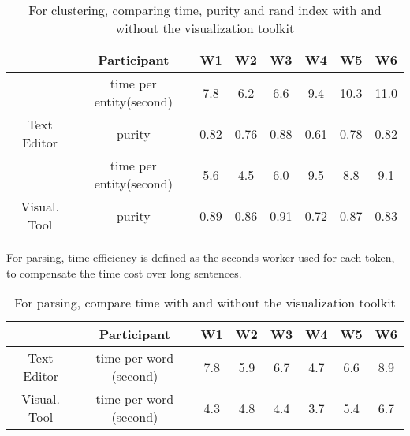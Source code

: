 \begin{table*}[bt]
\begin{center}
\begin{tabular}{|c|c|c|c|c|c|c|c|}
 \hline
 & Participant & W1 & W2 & W3 & W4 & W5 & W6 \\\hline
 &time per entity(second) & 7.8 & 6.2 & 6.6 & 9.4 & 10.3 & 11.0\\
Text Editor& purity & 0.82 & 0.76 & 0.88 & 0.61  & 0.78 & 0.82\\\hline
& time per entity(second) & 5.6 & 4.5 & 6.0 & 9.5 & 8.8 & 9.1\\
Visual. Tool& purity & 0.89 & 0.86 & 0.91 & 0.72 & 0.87 & 0.83\\\hline
\end{tabular}
\end{center}
\caption{For clustering, comparing time, purity and rand index with and without the visualization toolkit} \label{t:cluster}
\end{table*}

For parsing, time efficiency is defined as the seconds worker used for each token, to compensate the time cost over long sentences.
\begin{table*}[bt]
\begin{center}
\begin{tabular}{|c|c|c|c|c|c|c|c|}
 \hline
 & Participant & W1 & W2 & W3 & W4 & W5 & W6 \\\hline
 Text Editor & time per word (second) & 7.8 & 5.9  & 6.7 & 4.7 & 6.6 & 8.9\\\hline
Visual. Tool& time per word (second) & 4.3 & 4.8 & 4.4& 3.7 & 5.4 & 6.7\\\hline
\end{tabular}
\end{center}
\caption{For parsing, compare time with and without the visualization toolkit} \label{t:cluster}
\end{table*}

